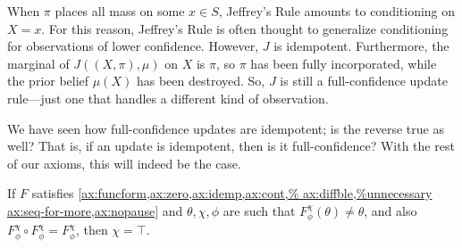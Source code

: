 \begin{enumerate}[wide, label=\textbf{\thesubsection.\arabic*}]
	When $\pi$ places all mass on some $x \in S$, Jeffrey's Rule amounts to conditioning on $X {=} x$.
	For this reason, Jeffrey's Rule is often thought to 
		generalize conditioning for observations of lower confidence.
	However, 
	$J$
	is idempotent.
	Furthermore, the marginal of
	$J((X,\pi),\mu)$
	on $X$ is $\pi$, so $\pi$ has been fully 
	incorporated, while the prior belief 
	$\mu(X)$
	has been destroyed.
	So, $J$ is still a full-confidence update rule---just 
	one that handles a different kind of observation.
\end{enumerate}


We have seen how full-confidence updates are idempotent; is the reverse true as well?
That is, if an update is idempotent, then is it full-confidence? 
With the rest of our axioms, this will indeed be the case.

\begin{prop}
	If $F$ satisfies
	\cref{ax:funcform,ax:zero,ax:idemp,ax:cont,%
		ax:diffble,%
		ax:seq-for-more,ax:nopause}
	and
 	 $\theta,\chi,\phi$ are such that 
	$F_\phi^\chi(\theta) \ne \theta$,
	and also
	$F^\chi_\phi \circ F^\chi_\phi = F^\chi_\phi$, then $\chi=\top$. 
\end{prop}

% 
% 




